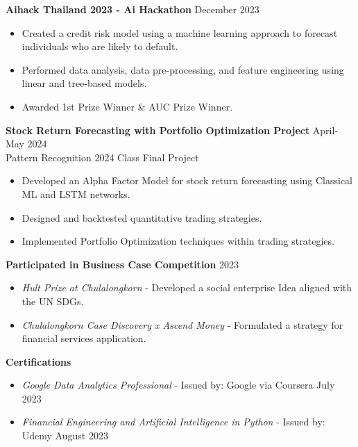 \documentclass[11pt]{article}
\begin{document}
\textbf{Aihack Thailand 2023 - Ai Hackathon} \hfill December 2023
\begin{itemize}[noitemsep, topsep=0pt, partopsep=0pt, parsep=0pt]
    \item Created a credit risk model using a machine learning approach to forecast individuals who are likely to default.
    \item Performed data analysis, data pre-processing, and feature engineering using linear and tree-based models.
    \item Awarded 1st Prize Winner \& AUC Prize Winner.
\end{itemize}

\vspace{3pt}

\textbf{Stock Return Forecasting with Portfolio Optimization Project} \hfill April-May 2024 \\
{\footnotesize Pattern Recognition 2024 Class Final Project}
\begin{itemize}[noitemsep, topsep=0pt, partopsep=0pt, parsep=0pt]
    \item Developed an Alpha Factor Model for stock return forecasting using Classical ML and LSTM networks.
    \item Designed and backtested quantitative trading strategies.
    \item Implemented Portfolio Optimization techniques within trading strategies.
\end{itemize}

\vspace{3pt}

\textbf{Participated in Business Case Competition} \hfill 2023
\begin{itemize}[noitemsep, topsep=0pt, partopsep=0pt, parsep=0pt]
    \item \textit{Hult Prize at Chulalongkorn} - Developed a social enterprise Idea aligned with the UN SDGs.
    \item \textit{Chulalongkorn Case Discovery x Ascend Money} - Formulated a strategy for financial services application.
\end{itemize}

\vspace{3pt}

\textbf{Certifications}
\begin{itemize}[noitemsep, topsep=0pt, partopsep=0pt, parsep=0pt]
    \item \textit{Google Data Analytics Professional} - Issued by: Google via Coursera \hfill July 2023
    \item \textit{Financial Engineering and Artificial Intelligence in Python} - Issued by: Udemy \hfill August 2023
\end{itemize}
\end{document}
